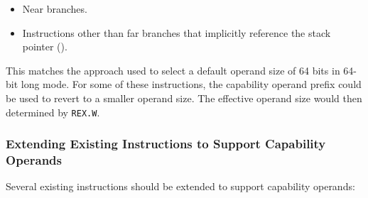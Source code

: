 \begin{itemize}
  \item Near branches.

  \item Instructions other than far branches that implicitly reference
    the stack pointer (\CSP{}).
\end{itemize}

This matches the approach used to select a default operand size of 64
bits in 64-bit long mode.  For some of these instructions, the
capability operand prefix could be used to revert to a smaller operand
size.  The effective operand size would then determined by \texttt{REX.W}.

\subsubsection{Extending Existing Instructions to Support Capability Operands}

Several existing instructions should be extended to support
capability operands:

